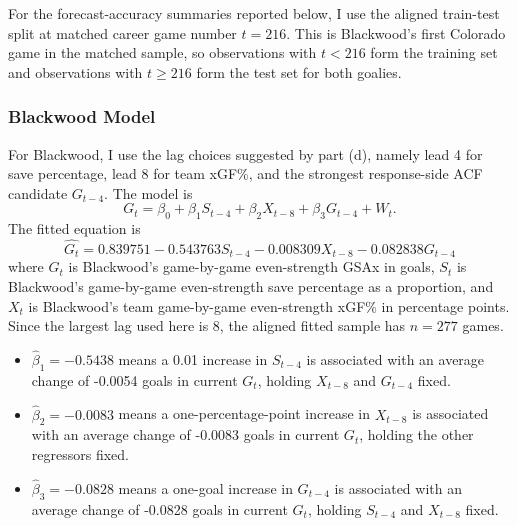 \documentclass[
  10pt,
]{extarticle}
\newenvironment{Shaded}{\begin{snugshade}}{\end{snugshade}}
\newcommand{\CommentTok}[1]{\textcolor[rgb]{0.56,0.35,0.01}{\textit{#1}}}
\newcommand{\NormalTok}[1]{#1}
\newcommand{\SpecialCharTok}[1]{\textcolor[rgb]{0.81,0.36,0.00}{\textbf{#1}}}
\providecommand{\tightlist}{%
  \setlength{\itemsep}{0pt}\setlength{\parskip}{0pt}}
\begin{document}
For the forecast-accuracy summaries reported below, I use the aligned train-test split at matched career game number \(t=216\). This is Blackwood's first Colorado game in the matched sample, so observations with \(t < 216\) form the training set and observations with \(t \ge 216\) form the test set for both goalies.

\subsubsection{Blackwood Model}\label{blackwood-model}

For Blackwood, I use the lag choices suggested by part (d), namely lead 4 for save percentage, lead 8 for team xGF\%, and the strongest response-side ACF candidate \(G_{t-4}\). The model is
\[
G_t = \beta_0 + \beta_1 S_{t-4} + \beta_2 X_{t-8} + \beta_3 G_{t-4} + W_t.
\]
The fitted equation is
\[
\widehat{G_t} = 0.839751 - 0.543763 S_{t-4} - 0.008309 X_{t-8} - 0.082838 G_{t-4}
\]
where \(G_t\) is Blackwood's game-by-game even-strength GSAx in goals, \(S_t\) is Blackwood's game-by-game even-strength save percentage as a proportion, and \(X_t\) is Blackwood's team game-by-game even-strength xGF\% in percentage points. Since the largest lag used here is 8, the aligned fitted sample has \(n=277\) games.

\begin{itemize}
\tightlist
\item
  \(\hat{\beta}_1=-0.5438\) means a 0.01 increase in \(S_{t-4}\) is associated with an average change of -0.0054 goals in current \(G_t\), holding \(X_{t-8}\) and \(G_{t-4}\) fixed.
\item
  \(\hat{\beta}_2=-0.0083\) means a one-percentage-point increase in \(X_{t-8}\) is associated with an average change of -0.0083 goals in current \(G_t\), holding the other regressors fixed.
\item
  \(\hat{\beta}_3=-0.0828\) means a one-goal increase in \(G_{t-4}\) is associated with an average change of -0.0828 goals in current \(G_t\), holding \(S_{t-4}\) and \(X_{t-8}\) fixed.
\end{itemize}

\begin{Shaded}
\end{Shaded}
\end{document}
